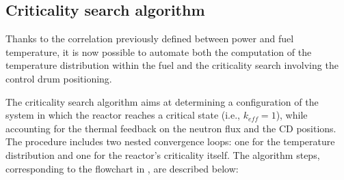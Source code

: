 \documentclass[preprint,review,12pt]{elsarticle}
\begin{document}


\subsection{Criticality search algorithm}
\label{subsec:criticality_search_method}
Thanks to the correlation previously defined between power and fuel temperature, it is now possible to automate both the computation of the temperature distribution within the fuel and the criticality search involving the control drum positioning.

The criticality search algorithm aims at determining a configuration of the system in which the reactor reaches a critical state (i.e., $k_{eff} = 1$), while accounting for the thermal feedback on the neutron flux and the CD positions. The procedure includes two nested convergence loops: one for the temperature distribution and one for the reactor's criticality itself. The algorithm steps, corresponding to the flowchart in , are described below:




\end{document}
